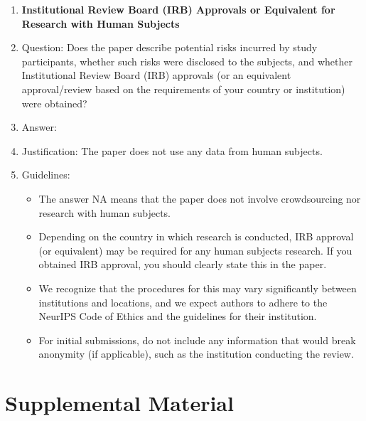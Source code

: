 \documentclass{article} %
\newcounter{ct}
\theoremstyle{definition}
\theoremstyle{remark}
\begin{document}
\begin{enumerate}
\item {\bf Institutional Review Board (IRB) Approvals or Equivalent for Research with Human Subjects}
    \item[] Question: Does the paper describe potential risks incurred by study participants, whether such risks were disclosed to the subjects, and whether Institutional Review Board (IRB) approvals (or an equivalent approval/review based on the requirements of your country or institution) were obtained?
    \item[] Answer:  \answerNA{} %
    \item[] Justification: The paper does not use any data from human subjects.
    \item[] Guidelines:
    \begin{itemize}
        \item The answer NA means that the paper does not involve crowdsourcing nor research with human subjects.
        \item Depending on the country in which research is conducted, IRB approval (or equivalent) may be required for any human subjects research. If you obtained IRB approval, you should clearly state this in the paper.
        \item We recognize that the procedures for this may vary significantly between institutions and locations, and we expect authors to adhere to the NeurIPS Code of Ethics and the guidelines for their institution.
        \item For initial submissions, do not include any information that would break anonymity (if applicable), such as the institution conducting the review.
    \end{itemize}

\end{enumerate}

\newpage
\appendix
\section*{Supplemental Material}
\setcounter{section}{0}
\renewcommand{\thefigure}{S\arabic{figure}} %
\renewcommand{\thesection}{S\arabic{section}} %
\end{document}
